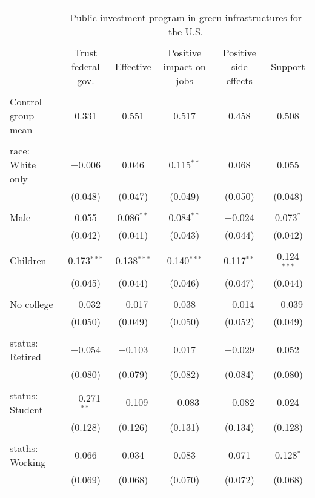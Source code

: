 
\begin{tabular}{@{\extracolsep{5pt}}lccccc} 
\\[-1.8ex]\hline 
\hline \\[-1.8ex] 
 & \multicolumn{5}{c}{Public investment program in green infrastructures for the U.S.} \\ 
\cline{2-6} 
\\[-1.8ex] & Trust federal gov. & Effective & Positive impact on jobs & Positive side effects & Support \\ 
\hline \\[-1.8ex] 
 Control group mean & 0.331 & 0.551 & 0.517 & 0.458 & 0.508  \\ \hline \\[-1.8ex] race: White only & $-$0.006 & 0.046 & 0.115$^{**}$ & 0.068 & 0.055 \\ 
  & (0.048) & (0.047) & (0.049) & (0.050) & (0.048) \\ 
  & & & & & \\ 
 Male & 0.055 & 0.086$^{**}$ & 0.084$^{**}$ & $-$0.024 & 0.073$^{*}$ \\ 
  & (0.042) & (0.041) & (0.043) & (0.044) & (0.042) \\ 
  & & & & & \\ 
 Children & 0.173$^{***}$ & 0.138$^{***}$ & 0.140$^{***}$ & 0.117$^{**}$ & 0.124$^{***}$ \\ 
  & (0.045) & (0.044) & (0.046) & (0.047) & (0.044) \\ 
  & & & & & \\ 
 No college & $-$0.032 & $-$0.017 & 0.038 & $-$0.014 & $-$0.039 \\ 
  & (0.050) & (0.049) & (0.050) & (0.052) & (0.049) \\ 
  & & & & & \\ 
 status: Retired & $-$0.054 & $-$0.103 & 0.017 & $-$0.029 & 0.052 \\ 
  & (0.080) & (0.079) & (0.082) & (0.084) & (0.080) \\ 
  & & & & & \\ 
 status: Student & $-$0.271$^{**}$ & $-$0.109 & $-$0.083 & $-$0.082 & 0.024 \\ 
  & (0.128) & (0.126) & (0.131) & (0.134) & (0.128) \\ 
  & & & & & \\ 
 staths: Working & 0.066 & 0.034 & 0.083 & 0.071 & 0.128$^{*}$ \\ 
  & (0.069) & (0.068) & (0.070) & (0.072) & (0.068) \\ 
  & & & & & \\ 

\end{tabular}
